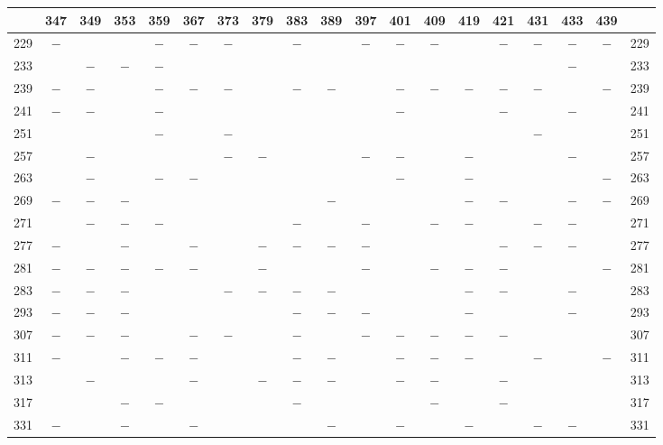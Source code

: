\clearpage
{}%
\begin{center}\begingroup\fontsize{8}{10.5}\selectfont\setlength{\tabcolsep}{2pt}
\begin{tabular}{r|c|c|c|c|c|c|c|c|c|c|c|c|c|c|c|c|c|r}
\hline
 & 347 & 349 & 353 & 359 & 367 & 373 & 379 & 383 & 389 & 397 & 401 & 409 & 419 & 421 & 431 & 433 & 439 & \\
\hline
229 & $-$ &  &  & $-$ & $-$ & $-$ &  & $-$ &  & $-$ & $-$ & $-$ &  & $-$ & $-$ & $-$ & $-$ & 229\\
233 &  & $-$ & $-$ & $-$ &  &  &  &  &  &  &  &  &  &  &  & $-$ &  & 233\\
239 & $-$ & $-$ &  & $-$ & $-$ & $-$ &  & $-$ & $-$ &  & $-$ & $-$ & $-$ & $-$ & $-$ &  & $-$ & 239\\
241 & $-$ & $-$ &  & $-$ &  &  &  &  &  &  & $-$ &  &  & $-$ &  & $-$ &  & 241\\
251 &  &  &  & $-$ &  & $-$ &  &  &  &  &  &  &  &  & $-$ &  &  & 251\\
257 &  & $-$ &  &  &  & $-$ & $-$ &  &  & $-$ & $-$ &  & $-$ &  &  & $-$ &  & 257\\
263 &  & $-$ &  & $-$ & $-$ &  &  &  &  &  & $-$ &  & $-$ &  &  &  & $-$ & 263\\
269 & $-$ & $-$ & $-$ &  &  &  &  &  & $-$ &  &  &  & $-$ & $-$ &  & $-$ & $-$ & 269\\
271 &  & $-$ & $-$ & $-$ &  &  &  & $-$ &  & $-$ &  & $-$ & $-$ &  & $-$ & $-$ &  & 271\\
277 & $-$ &  & $-$ &  & $-$ &  & $-$ & $-$ & $-$ & $-$ &  &  &  & $-$ & $-$ & $-$ &  & 277\\
281 & $-$ & $-$ & $-$ & $-$ & $-$ &  & $-$ &  &  & $-$ &  & $-$ & $-$ & $-$ &  &  & $-$ & 281\\
283 & $-$ & $-$ & $-$ &  &  & $-$ & $-$ & $-$ & $-$ &  &  &  & $-$ & $-$ &  & $-$ &  & 283\\
293 & $-$ & $-$ & $-$ &  &  &  &  & $-$ & $-$ & $-$ &  &  & $-$ &  &  & $-$ &  & 293\\
307 & $-$ & $-$ & $-$ &  & $-$ & $-$ &  & $-$ &  & $-$ & $-$ & $-$ & $-$ & $-$ &  &  &  & 307\\
311 & $-$ &  & $-$ & $-$ & $-$ &  &  & $-$ & $-$ &  & $-$ & $-$ & $-$ &  & $-$ &  & $-$ & 311\\
313 &  & $-$ &  &  & $-$ &  & $-$ & $-$ & $-$ &  & $-$ & $-$ &  & $-$ &  &  &  & 313\\
317 &  &  & $-$ & $-$ &  &  &  & $-$ &  &  &  & $-$ &  & $-$ &  &  &  & 317\\
331 & $-$ &  & $-$ &  & $-$ &  &  &  & $-$ &  & $-$ &  & $-$ &  & $-$ & $-$ &  & 331\\

\end{tabular}
\end{center}
